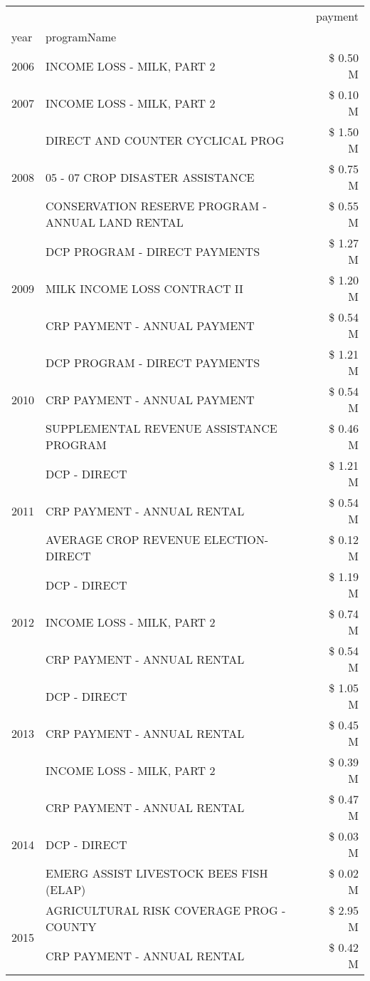 \begin{tabular}{llr}
\toprule
 &  & payment \\
year & programName &  \\
\midrule
2006 & INCOME LOSS - MILK, PART 2 & \$ 0.50 M \\
\cline{1-3}
2007 & INCOME LOSS - MILK, PART 2 & \$ 0.10 M \\
\cline{1-3}
\multirow[t]{3}{*}{2008} & DIRECT AND COUNTER CYCLICAL PROG & \$ 1.50 M \\
 & 05 - 07 CROP DISASTER ASSISTANCE & \$ 0.75 M \\
 & CONSERVATION RESERVE PROGRAM - ANNUAL LAND RENTAL & \$ 0.55 M \\
\cline{1-3}
\multirow[t]{3}{*}{2009} & DCP PROGRAM - DIRECT PAYMENTS & \$ 1.27 M \\
 & MILK INCOME LOSS CONTRACT II & \$ 1.20 M \\
 & CRP PAYMENT - ANNUAL PAYMENT & \$ 0.54 M \\
\cline{1-3}
\multirow[t]{3}{*}{2010} & DCP PROGRAM - DIRECT PAYMENTS & \$ 1.21 M \\
 & CRP PAYMENT - ANNUAL PAYMENT & \$ 0.54 M \\
 & SUPPLEMENTAL REVENUE ASSISTANCE PROGRAM & \$ 0.46 M \\
\cline{1-3}
\multirow[t]{3}{*}{2011} & DCP - DIRECT & \$ 1.21 M \\
 & CRP PAYMENT - ANNUAL RENTAL & \$ 0.54 M \\
 & AVERAGE CROP REVENUE ELECTION-DIRECT & \$ 0.12 M \\
\cline{1-3}
\multirow[t]{3}{*}{2012} & DCP - DIRECT & \$ 1.19 M \\
 & INCOME LOSS - MILK, PART 2 & \$ 0.74 M \\
 & CRP PAYMENT - ANNUAL RENTAL & \$ 0.54 M \\
\cline{1-3}
\multirow[t]{3}{*}{2013} & DCP - DIRECT & \$ 1.05 M \\
 & CRP PAYMENT - ANNUAL RENTAL & \$ 0.45 M \\
 & INCOME LOSS - MILK, PART 2 & \$ 0.39 M \\
\cline{1-3}
\multirow[t]{3}{*}{2014} & CRP PAYMENT - ANNUAL RENTAL & \$ 0.47 M \\
 & DCP - DIRECT & \$ 0.03 M \\
 & EMERG ASSIST LIVESTOCK BEES FISH (ELAP) & \$ 0.02 M \\
\cline{1-3}
\multirow[t]{3}{*}{2015} & AGRICULTURAL RISK COVERAGE PROG - COUNTY & \$ 2.95 M \\
 & CRP PAYMENT - ANNUAL RENTAL & \$ 0.42 M \\

\end{tabular}
